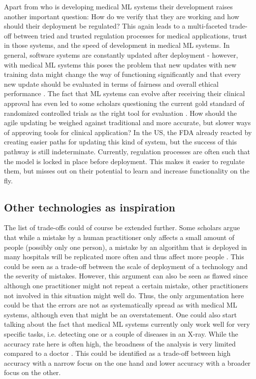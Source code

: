 Apart from who is developing medical ML systems their development raises another important question: How do we verify that they are working and how should their deployment be regulated? This again leads to a multi-faceted trade-off between tried and trusted regulation processes for medical applications, trust in those systems, and the speed of development in medical ML systems. In general, software systems are constantly updated after deployment - however, with medical ML systems this poses the problem that new updates with new training data might change the way of functioning significantly and that every new update should be evaluated in terms of fairness and overall ethical performance \cite{he2019practical}. The fact that ML systems can evolve after receiving their clinical approval has even led to some scholars questioning the current gold standard of randomized controlled trials as the right tool for evaluation \cite{genin2021randomized}.
How should the agile updating be weighed against traditional and more accurate, but slower ways of approving tools for clinical application? In the US, the FDA already reacted by creating easier paths for updating this kind of system, but the success of this pathway is still indeterminate. Currently, regulation processes are often such that the model is locked in place before deployment. This makes it easier to regulate them, but misses out on their potential to learn and increase functionality on the fly. 


\subsection{Other technologies as inspiration}


The list of trade-offs could of course be extended further. Some scholars argue that while a mistake by a human practitioner only affects a small amount of people (possibly only one person), a mistake by an algorithm that is deployed in many hospitals will be replicated more often and thus affect more people \cite{Morley2020}. This could be seen as a trade-off between the scale of deployment of a technology and the severity of mistakes. However, this argument can also be seen as flawed since although one practitioner might not repeat a certain mistake, other practitioners not involved in this situation might well do. Thus, the only argumentation here could be that the errors are not as systematically spread as with medical ML systems, although even that might be an overstatement. One could also start talking about the fact that medical ML systems currently only work well for very specific tasks, i.e. detecting one or a couple of diseases in an X-ray. While the accuracy rate here is often high, the broadness of the analysis is very limited compared to a doctor \cite{topol2019high, rajpurkar2022ai}. This could be identified as a trade-off between high accuracy with a narrow focus on the one hand and lower accuracy with a broader focus on the other. 


